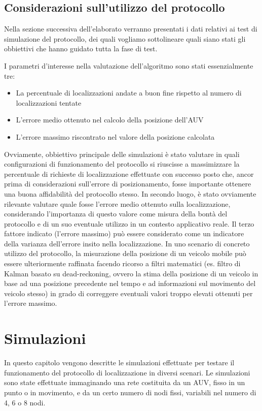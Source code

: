 \documentclass[Lau,binding=0.6cm]{sapthesis}
\begin{document}
\section{Considerazioni sull'utilizzo del protocollo}
\par
Nella sezione successiva dell'elaborato verranno presentati i dati relativi ai test di simulazione del protocollo, dei quali vogliamo sottolineare quali siano stati gli obbiettivi che hanno guidato tutta la fase di test.
\par
I parametri d'interesse nella valutazione dell'algoritmo sono stati essenzialmente tre:
\begin{itemize}
\item La percentuale di localizzazioni andate a buon fine rispetto al numero di localizzazioni tentate
\item L'errore medio ottenuto nel calcolo della posizione dell'AUV
\item L'errore massimo riscontrato nel valore della posizione calcolata
\end{itemize}
Ovviamente, obbiettivo principale delle simulazioni è stato valutare in quali configurazioni di funzionamento del protocollo si riuscisse a massimizzare la percentuale di richieste di localizzazione effettuate con successo posto che, ancor prima di considerazioni sull'errore di posizionamento, fosse importante ottenere una buona affidabilità del protocollo stesso.  In secondo luogo, è stato ovviamente rilevante valutare quale fosse l'errore medio ottenuto sulla localizzazione, considerando l'importanza di questo valore come misura della bontà del protocollo e di un suo eventuale utilizzo in un contesto applicativo reale. Il terzo fattore indicato (l'errore massimo) può essere considerato come un indicatore della varianza dell'errore insito nella localizzazione. In uno scenario di concreto utilizzo del protocollo, la misurazione della posizione di un veicolo mobile può essere ulteriormente raffinata facendo ricorso a filtri matematici (es. filtro di Kalman basato su dead-reckoning, ovvero  la stima della posizione  di un veicolo in base ad una posizione precedente nel tempo e ad informazioni sul movimento del veicolo stesso) in grado di correggere eventuali valori troppo elevati ottenuti per l'errore massimo.



\chapter{Simulazioni}
In questo capitolo vengono descritte le simulazioni effettuate per testare il funzionamento del protocollo di localizzazione in diversi scenari. \newline Le simulazioni sono state effettuate immaginando una rete costituita da un AUV, fisso in un punto o in movimento, e da un certo numero di nodi fissi, variabili nel numero di 4, 6 o 8 nodi.
\end{document}
